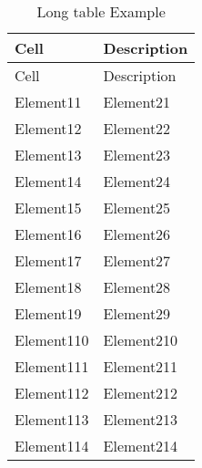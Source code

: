 \begin{longtable}[c]{| m{4.4cm} | m{11cm} |}
\caption{Long table Example}\\
 \hline

 Cell & Description  \\ 
 \hline
 \endfirsthead

 \hline
 
 Cell & Description  \\ 
 \hline
 \endhead

        \hline
          Element11 & Element21 \\
        \hline
          Element12 & Element22 \\
        \hline
          Element13 & Element23 \\
        \hline
          Element14 & Element24 \\
        \hline
          Element15 & Element25 \\
        \hline
          Element16 & Element26 \\
        \hline
          Element17 & Element27 \\
        \hline
          Element18 & Element28 \\
        \hline
          Element19 & Element29 \\
        \hline
          Element110 & Element210 \\
        \hline
          Element111 & Element211 \\
        \hline
          Element112 & Element212 \\
        \hline
          Element113 & Element213 \\
        \hline
          Element114 & Element214 \\
        \hline

 \end{longtable}
